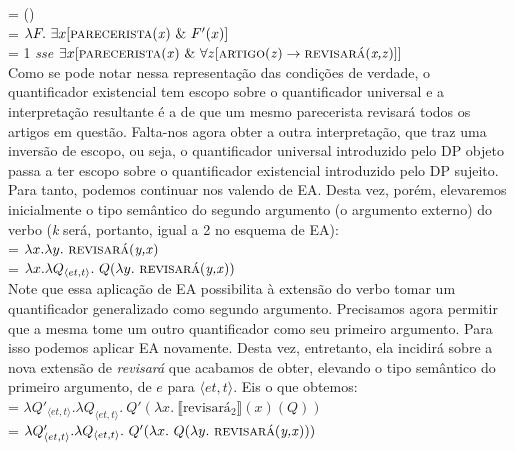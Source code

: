 \n {} = ()\\

\n {} = $\lambda F.\ \exists x [\text{\textsc{parecerista}(\textit{x})}\ \&\ F'(x)]$\\

\n {} = 1 \textit{sse} $\exists x [\text{\textsc{parecerista}(\textit{x})}\ \&\ \forall z [\text{\textsc{artigo}(\textit{z})} \rightarrow \text{\textsc{revisará}(\textit{x,z})}]]$\\

\n Como se pode notar nessa representação das condições de verdade, o quantificador existencial tem escopo sobre o quantificador universal e a interpretação resultante é a de que um mesmo parecerista revisará todos os artigos em questão. Falta-nos agora obter a outra interpretação, que traz uma inversão de escopo, ou seja, o quantificador universal introduzido pelo DP objeto passa a ter escopo sobre o quantificador existencial introduzido pelo DP sujeito. Para tanto, podemos continuar nos valendo de EA. Desta vez, porém, elevaremos inicialmente o tipo semântico do segundo argumento (o argumento externo) do verbo (\textit{k} será, portanto, igual a 2 no esquema de EA):\\

\n {} = $\lambda x.\lambda y.\ \predica{revisará}{y,x}$\\

\n {} = $\lambda x.\lambda Q_{\langle et,t\rangle}.\ Q(\lambda y.\ \predica{revisará}{y,x})$\\

\n Note que essa aplicação de EA possibilita à extensão do verbo tomar um quantificador generalizado como segundo argumento. Precisamos agora permitir que a mesma tome um outro quantificador como seu primeiro argumento. Para isso podemos aplicar EA novamente. Desta vez, entretanto, ela incidirá sobre a nova extensão de \textit{revisará} que acabamos de obter, elevando o tipo semântico do primeiro argumento, de $e$ para $\langle et,t\rangle$. Eis o que obtemos:\\

\n {} = $\lambda Q'_{\langle et,t\rangle}.\lambda Q_{\langle et,t\rangle}.\ Q'(\lambda x.\ \llbracket \text{revisará}_{2} \rrbracket(x)(Q))$\\

\n {} = $\lambda Q'_{\langle et,t\rangle}.\lambda Q_{\langle et,t\rangle}.\ Q'(\lambda x.\ Q(\lambda y.\ \predica{revisará}{y,x}))$\\


